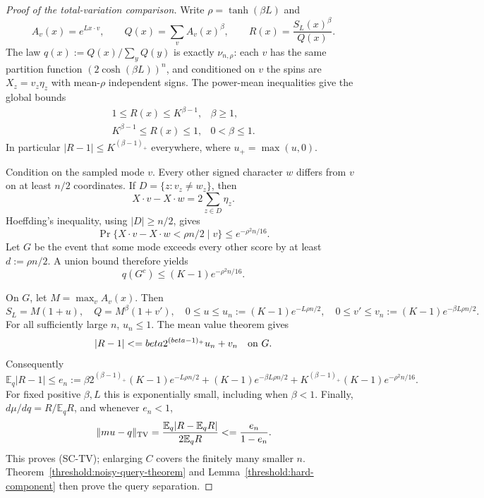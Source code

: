 \begin{proof}[Proof of the total-variation comparison]
Write $\rho=\tanh(\beta L)$ and
\[
 A_v(x)=e^{Lx\cdot v},\qquad
 Q(x)=\sum_v A_v(x)^\beta,\qquad
 R(x)=\frac{S_L(x)^\beta}{Q(x)}.
\]
The law $q(x):=Q(x)/\sum_yQ(y)$ is exactly $\nu_{n,\rho}$:
each $v$ has the same partition function $(2\cosh(\beta L))^n$,
and conditioned on $v$ the spins are $X_z=v_z\eta_z$ with mean-$\rho$
independent signs.  The power-mean inequalities give the global bounds
\[
 \begin{array}{ll}
 1\le R(x)\le K^{\beta-1},&\beta\ge1,\\
 K^{\beta-1}\le R(x)\le1,&0<\beta\le1.
 \end{array}
 \tag{SC-R}
\]
In particular $|R-1|\le K^{(\beta-1)_+}$ everywhere, where
$u_+=\max(u,0)$.

Condition on the sampled mode $v$.  Every other signed character $w$
differs from $v$ on at least $n/2$ coordinates.  If $D=\{z:v_z\ne w_z\}$,
then
\[
 X\cdot v-X\cdot w=2\sum_{z\in D}\eta_z.
\]
Hoeffding's inequality, using $|D|\ge n/2$, gives
\[
 \Pr\{X\cdot v-X\cdot w<\rho n/2\mid v\}
 \le e^{-\rho^2n/16}.
\]
Let $G$ be the event that some mode exceeds every other score by at
least $d:=\rho n/2$.  A union bound therefore yields
\[
 q(G^c)\le(K-1)e^{-\rho^2n/16}.
 \tag{SC-bad}
\]

On $G$, let $M=\max_v A_v(x)$.  Then
\[
 S_L=M(1+u),\quad Q=M^\beta(1+v'),\quad
 0\le u\le u_n:=(K-1)e^{-L\rho n/2},\quad
 0\le v'\le v_n:=(K-1)e^{-\beta L\rho n/2}.
\]
For all sufficiently large $n$, $u_n\le1$.  The mean value theorem
gives
\[
 |R-1|\le\beta2^{(\beta-1)_+}u_n+v_n
 \quad\hbox{on }G.
\]
Consequently
\[
 \mathbb E_q|R-1|\le e_n:={}
 \beta2^{(\beta-1)_+}(K-1)e^{-L\rho n/2}
 +(K-1)e^{-\beta L\rho n/2}
 +K^{(\beta-1)_+}(K-1)e^{-\rho^2n/16}.
 \tag{SC-error}
\]
For fixed positive $\beta,L$ this is exponentially small, including
when $\beta<1$.  Finally,
$d\mu/dq=R/\mathbb E_qR$, and whenever $e_n<1$,
\[
 \|\mu-q\|_{\rm TV}
 =\frac{\mathbb E_q|R-\mathbb E_qR|}{2\mathbb E_qR}
 \le\frac{e_n}{1-e_n}.
\]
This proves (SC-TV); enlarging $C$ covers the finitely many smaller
$n$.  Theorem~\ref{threshold:noisy-query-theorem} and
Lemma~\ref{threshold:hard-component} then prove the query separation.
\end{proof}

